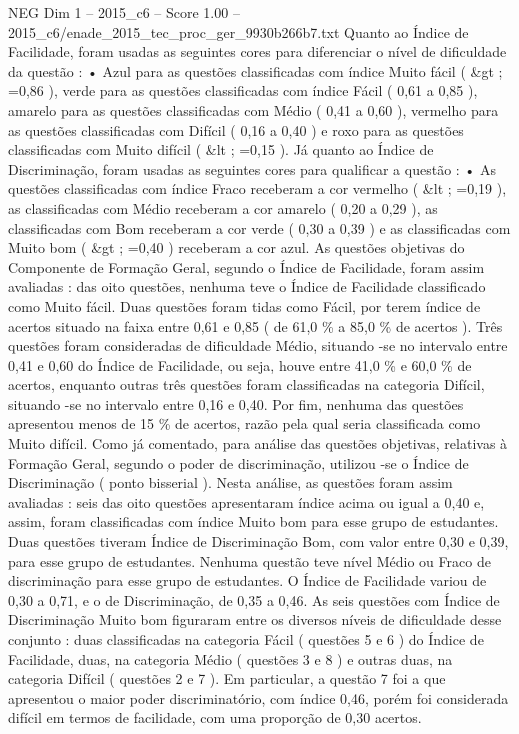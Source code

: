 \begin{textsample}{NEG Dim 1 – 2015\_c6 – Score 1.00 – 2015\_c6/enade\_2015\_tec\_proc\_ger\_9930b266b7.txt}
Quanto ao Índice de Facilidade, foram usadas as seguintes cores para diferenciar o nível de dificuldade da questão : • Azul para as questões classificadas com índice Muito fácil ( \&gt ; =0,86 ), verde para as questões classificadas com índice Fácil ( 0,61 a 0,85 ), amarelo para as questões classificadas com Médio ( 0,41 a 0,60 ), vermelho para as questões classificadas com Difícil ( 0,16 a 0,40 ) e roxo para as questões classificadas com Muito difícil ( \&lt ; =0,15 ).
Já quanto ao Índice de Discriminação, foram usadas as seguintes cores para qualificar a questão : • As questões classificadas com índice Fraco receberam a cor vermelho ( \&lt ; =0,19 ), as classificadas com Médio receberam a cor amarelo ( 0,20 a 0,29 ), as classificadas com Bom receberam a cor verde ( 0,30 a 0,39 ) e as classificadas com Muito bom ( \&gt ; =0,40 ) receberam a cor azul.
As questões objetivas do Componente de Formação Geral, segundo o Índice de Facilidade, foram assim avaliadas : das oito questões, nenhuma teve o Índice de Facilidade classificado como Muito fácil.
Duas questões foram tidas como Fácil, por terem índice de acertos situado na faixa entre 0,61 e 0,85 ( de 61,0 \% a 85,0 \% de acertos ).
Três questões foram consideradas de dificuldade Médio, situando -se no intervalo entre 0,41 e 0,60 do Índice de Facilidade, ou seja, houve entre 41,0 \% e 60,0 \% de acertos, enquanto outras três questões foram classificadas na categoria Difícil, situando -se no intervalo entre 0,16 e 0,40.
Por fim, nenhuma das questões apresentou menos de 15 \% de acertos, razão pela qual seria classificada como Muito difícil.
Como já comentado, para análise das questões objetivas, relativas à Formação Geral, segundo o poder de discriminação, utilizou -se o Índice de Discriminação ( ponto bisserial ).
Nesta análise, as questões foram assim avaliadas : seis das oito questões apresentaram índice acima ou igual a 0,40 e, assim, foram classificadas com índice Muito bom para esse grupo de estudantes.
Duas questões tiveram Índice de Discriminação Bom, com valor entre 0,30 e 0,39, para esse grupo de estudantes.
Nenhuma questão teve nível Médio ou Fraco de discriminação para esse grupo de estudantes.
O Índice de Facilidade variou de 0,30 a 0,71, e o de Discriminação, de 0,35 a 0,46.
As seis questões com Índice de Discriminação Muito bom figuraram entre os diversos níveis de dificuldade desse conjunto : duas classificadas na categoria Fácil ( questões 5 e 6 ) do Índice de Facilidade, duas, na categoria Médio ( questões 3 e 8 ) e outras duas, na categoria Difícil ( questões 2 e 7 ).
Em particular, a questão 7 foi a que apresentou o maior poder discriminatório, com índice 0,46, porém foi considerada difícil em termos de facilidade, com uma proporção de 0,30 acertos.

\end{textsample}

